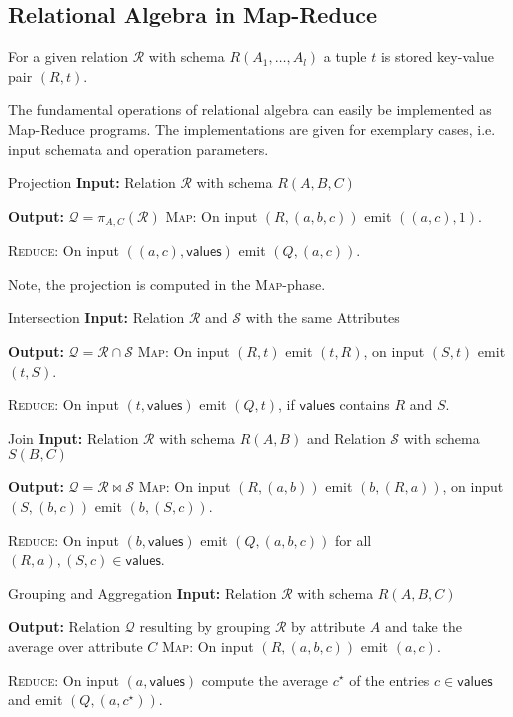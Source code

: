 \documentclass{panikzettel}
\begin{document}

\subsection{Relational Algebra in Map-Reduce}
For a given relation $\mathcal{R}$ with schema $R(A_1, \ldots, A_l)$ a tuple $t$ is stored key-value pair $(R,t)$.

The fundamental operations of relational algebra can easily be implemented as Map-Reduce programs. The implementations are given for exemplary cases, i.e. input schemata and operation parameters.

\begin{algo}{Projection}
\textbf{Input:} Relation $\mathcal{R}$ with schema $R(A,B,C)$

\textbf{Output:} $\mathcal{Q} = \pi_{A,C}(\mathcal{R})$
\tcblower
\textsc{Map}: On input $(R,(a,b,c))$ emit $((a,c),1)$.

\textsc{Reduce}: On input $((a,c), \textsf{values})$ emit $(Q,(a,c))$.
\end{algo}

Note, the projection is computed in the \textsc{Map}-phase.

\begin{algo}{Intersection}
\textbf{Input:} Relation $\mathcal{R}$ and $\mathcal{S}$ with the same Attributes

\textbf{Output:} $\mathcal{Q} = \mathcal{R} \cap \mathcal{S}$
\tcblower
\textsc{Map}: On input $(R,t)$ emit $(t,R)$, on input $(S,t)$ emit $(t,S)$.

\textsc{Reduce}: On input $(t, \textsf{values})$ emit $(Q,t)$, if $\textsf{values}$ contains $R$ and $S$.
\end{algo}

\begin{algo}{Join}
\textbf{Input:} Relation $\mathcal{R}$ with schema $R(A,B)$ and Relation $\mathcal{S}$ with schema $S(B,C)$

\textbf{Output:} $\mathcal{Q} = \mathcal{R} \bowtie \mathcal{S}$
\tcblower
\textsc{Map}: On input $(R,(a,b))$ emit $(b,(R,a))$, on input $(S,(b,c))$ emit $(b,(S,c))$.

\textsc{Reduce}: On input $(b, \textsf{values})$ emit $(Q,(a,b,c))$ for all $(R,a),(S,c) \in \textsf{values}$.
\end{algo}

\begin{algo}{Grouping and Aggregation}
\textbf{Input:} Relation $\mathcal{R}$ with schema $R(A,B,C)$

\textbf{Output:} Relation $\mathcal{Q}$ resulting by grouping $\mathcal{R}$ by attribute $A$ and take the average over attribute $C$
\tcblower
\textsc{Map}: On input $(R,(a,b,c))$ emit $(a,c)$.

\textsc{Reduce}: On input $(a, \textsf{values})$ compute the average $c^\star$ of the entries $c \in \textsf{values}$ and emit $(Q,(a,c^\star))$.
\end{algo}
\end{document}

